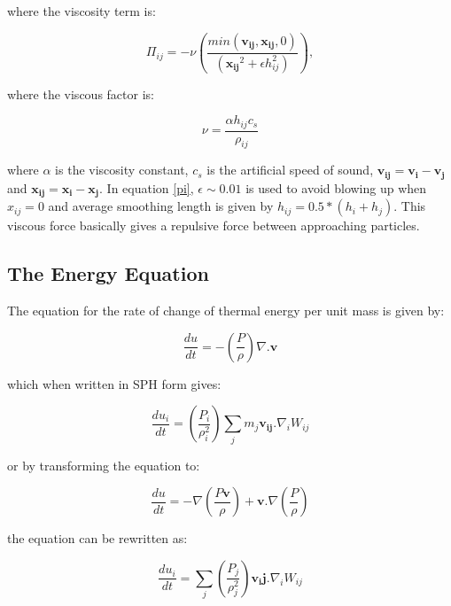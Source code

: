 where the viscosity term is:

\begin{equation}
 \Pi_{ij} = -\nu \left( \frac{min(\mathbf{v_{ij}}, \mathbf{x_{ij}}, 0)}{(\mathbf{x_{ij}}^2 + \epsilon h_{ij}^2)}\right), 
  \label{pi}
 \end{equation}

\noindent
where the viscous factor is:

\begin{equation}
 \nu = \frac{\alpha h_{ij}c_s}{\rho_{ij}}
\end{equation}

\noindent
where $\alpha$ is the viscosity constant, $c_s$ is the artificial
speed of sound, $\mathbf{v_{ij}} = \mathbf{v_i} - \mathbf{v_j}$
and $\mathbf{x_{ij}} = \mathbf{x_i} - \mathbf{x_j}$. In equation \ref{pi},
$\epsilon \sim 0.01$ is used to avoid blowing up when $x_{ij} = 0$ and average smoothing length is given by
$h_{ij} = 0.5*(h_i + h_j)$. This viscous force basically gives a repulsive force between approaching particles.

\subsection{The Energy Equation}

The equation for the rate of change of thermal energy per unit mass is given by:

\begin{equation}
 \frac{du}{dt} = -\left( \frac{P}{\rho} \right)\nabla. \mathbf{v}
\end{equation}

\noindent
which when written in SPH form gives:

\begin{equation}
 \frac{du_i}{dt} = \left(\frac{P_i}{\rho_i^2}\right)\sum_j m_j \mathbf{v_{ij}}.\nabla_iW_{ij}
\end{equation}

\noindent
or by transforming the equation to:

\begin{equation}
 \frac{du}{dt} = -\nabla\left(\frac{P\mathbf{v}}{\rho}\right) + \mathbf{v}.\nabla\left(\frac{P}{\rho}\right)
\end{equation}

\noindent 
the equation can be rewritten as:

\begin{equation}
 \frac{du_i}{dt} = \sum_j \left( \frac{P_j}{\rho_j^2} \right)\mathbf{v_ij}.\nabla_i W_{ij}
\end{equation}

